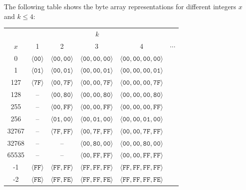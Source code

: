 \documentclass[bibtotoc,halfparskip,oneside]{scrreprt}
\newcommand{\hex}[1]{\ensuremath{\mathtt{#1}}}
\begin{document}
The following table shows the byte array representations for different integers $x$ and $k\leq 4$:

\begin{center}
\begin{tabular}{c|ccccc}
\multicolumn{1}{c}{}& \multicolumn{4}{c}{$k$} \\
      $x$  & 1 & 2 & 3  & 4 & $\cdots$ \\\cline{1-6}
     0     & $\langle \hex{00}\rangle$ & $\langle\hex{00},\hex{00}\rangle$ & $\langle\hex{00},\hex{00},\hex{00}\rangle$& $\langle\hex{00},\hex{00},\hex{00},\hex{00}\rangle$ \\
     1     & $\langle\hex{01}\rangle$ & $\langle\hex{00},\hex{01}\rangle$ & $\langle\hex{00},\hex{00},\hex{01}\rangle$& $\langle\hex{00},\hex{00},\hex{00},\hex{01}\rangle$\\
     127   & $\langle\hex{7F}\rangle$ & $\langle\hex{00},\hex{7F}\rangle$ & $\langle\hex{00},\hex{00},\hex{7F}\rangle$ & $\langle\hex{00},\hex{00},\hex{00},\hex{7F}\rangle$\\
     128   & -- & $\langle\hex{00},\hex{80}\rangle$ & $\langle\hex{00},\hex{00},\hex{80}\rangle$ & $\langle\hex{00},\hex{00},\hex{00},\hex{80}\rangle$\\
     255   & -- & $\langle\hex{00},\hex{FF}\rangle$ & $\langle\hex{00},\hex{00},\hex{FF}\rangle$ & $\langle\hex{00},\hex{00},\hex{00},\hex{FF}\rangle$\\
     256   & -- & $\langle\hex{01},\hex{00}\rangle$ & $\langle\hex{00},\hex{01},\hex{00}\rangle$ & $\langle\hex{00},\hex{00},\hex{01},\hex{00}\rangle$\\
     32767 & -- & $\langle\hex{7F},\hex{FF}\rangle$ & $\langle\hex{00},\hex{7F},\hex{FF}\rangle$ & $\langle\hex{00},\hex{00},\hex{7F},\hex{FF}\rangle$\\
     32768 & -- & -- & $\langle\hex{00},\hex{80},\hex{00}\rangle$ & $\langle\hex{00},\hex{00},\hex{80},\hex{00}\rangle$\\
     65535 & -- & -- & $\langle\hex{00},\hex{FF},\hex{FF}\rangle$ & $\langle\hex{00},\hex{00},\hex{FF},\hex{FF}\rangle$\\
     -1    & $\langle\hex{FF}\rangle$ & $\langle\hex{FF},\hex{FF}\rangle$ & $\langle\hex{FF},\hex{FF},\hex{FF}\rangle$& $\langle\hex{FF},\hex{FF},\hex{FF},\hex{FF}\rangle$\\
     -2    & $\langle\hex{FE}\rangle$ & $\langle\hex{FF},\hex{FE}\rangle$ & $\langle\hex{FF},\hex{FF},\hex{FE}\rangle$& $\langle\hex{FF},\hex{FF},\hex{FF},\hex{FE}\rangle$\\

\end{tabular}
\end{center}
\end{document}
